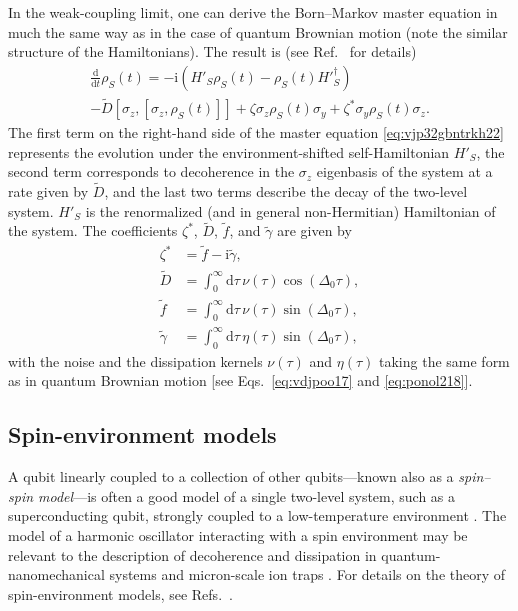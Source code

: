 \documentclass[aps,pra,reprint,amsmath,amssymb,showpacs,nofootinbib,floatfix,onecolumn,12pt]{revtex4-1}
\newcommand{\D}{\text{d}}
\newcommand{\I}{\text{i}}
\begin{document}
In the weak-coupling limit, one can derive the Born--Markov master equation in much the same way as in the case of quantum Brownian motion (note the similar structure of the Hamiltonians). The result is (see Ref.~\cite{Schlosshauer:2007:un} for details)
%
\begin{multline}
\label{eq:vjp32gbntrkh22}
\frac{\D}{\D t} \rho_S(t) = -\I \left(
  H'_S \rho_S(t) - {\rho}_S(t)
  H'^\dagger_S \right) \\ - \widetilde{D} \left[
  \sigma_z, \left[ \sigma_z, \rho_S(t)
  \right]\right]  + \zeta \sigma_z
\rho_S(t)\sigma_y + \zeta^* \sigma_y
\rho_S(t)\sigma_z.
\end{multline}
%
The first term on the right-hand side of the master equation \eqref{eq:vjp32gbntrkh22} represents the evolution under the environment-shifted self-Hamiltonian $H'_S$, the second term corresponds to decoherence in the $\sigma_z$ eigenbasis of the system at a rate given by $\widetilde{D}$, and the last two terms describe the decay of the two-level system. $H'_S$ is the renormalized (and in general non-Hermitian) Hamiltonian of the
system. The coefficients $\zeta^*$, $\widetilde{D}$, $\widetilde{f}$, and $\widetilde{\gamma}$ are given by
%
\begin{subequations}
\begin{align}
  \zeta^* &= \widetilde{f} - \I \widetilde{\gamma}, \\
  \widetilde{D} &= \int_0^\infty \D \tau \,
  \nu(\tau) \cos\left( \Delta_0 \tau \right), \\
  \widetilde{f} &=  \int_0^\infty \D \tau \, \nu(\tau)
  \sin\left( \Delta_0 \tau
  \right), \label{eq:dfvsih882e46b}\\
  \widetilde{\gamma} &=  \int_0^\infty \D \tau \, \eta(\tau)
  \sin\left( \Delta_0 \tau \right),\label{eq:dfvsih882e46c}
\end{align}
\end{subequations}
%
with the noise and the dissipation kernels $\nu(\tau)$ and $\eta(\tau)$ taking the same form as in quantum Brownian motion [see Eqs.~\eqref{eq:vdjpoo17} and \eqref{eq:ponol218}]. 

\subsection{\label{sec:spin-envir-models}Spin-environment models}

A qubit linearly coupled to a collection of other qubits---known also as a \emph{spin--spin model}---is often a good model of a single two-level system, such as a superconducting qubit, strongly coupled to a low-temperature environment \cite{Prokofev:2000:zz,Dube:2001:zz}. The model of a harmonic oscillator interacting with a spin environment may be relevant to the description of decoherence and dissipation in quantum-nanomechanical systems and micron-scale ion traps \cite{Schlosshauer:2008:os}. For details on the theory of spin-environment models, see Refs.~\cite{Dube:2001:zz,Stamp:1998:im,Prokofev:1995:ab,Prokofev:1993:aa}.
\end{document}
